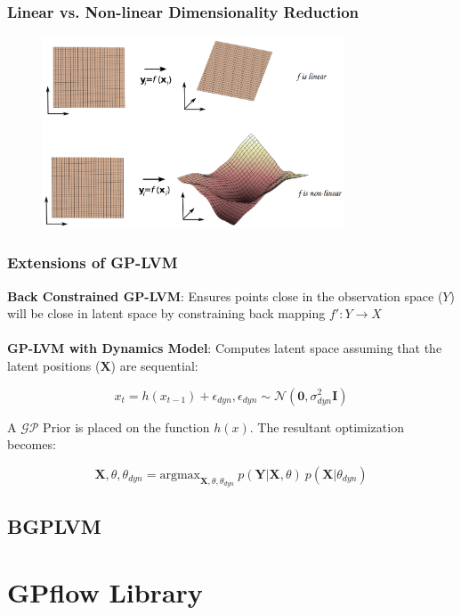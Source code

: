 \documentclass[10pt]{beamer}
\begin{document}
  \begin{frame}
  \frametitle{Linear vs. Non-linear Dimensionality Reduction}

  \begin{figure}
    \centering
    \includegraphics[width=0.8\textwidth]{mapping.png}
  \end{figure}

  \end{frame}

  \begin{frame}
  \frametitle{Extensions of GP-LVM}

  \textbf{Back Constrained GP-LVM}: Ensures points close in the observation space ($Y$) will be close in latent space by constraining back mapping $f': Y \rightarrow X$\\~\\

  \textbf{GP-LVM with Dynamics Model}: Computes latent space assuming that the latent positions ($\mathbf{X}$) are sequential:

  \begin{equation}
    x_t = h(x_{t-1}) + \epsilon_{dyn}, \epsilon_{dyn} \sim \mathcal{N}(\mathbf{0},\sigma^2_{dyn}\mathbf{I})
  \end{equation}

  A $\mathcal{GP}$ Prior is placed on the function $h(x)$. The resultant optimization becomes:

  \begin{equation}
    \mathbf{X},\theta,\theta_{dyn} = \text{argmax}_{\mathbf{X},\theta,\theta_{dyn}}~p(\mathbf{Y}|\mathbf{X},\theta)~p(\mathbf{X}|\theta_{dyn})
  \end{equation}
  \end{frame}

  \subsection{BGPLVM}

  \section{GPflow Library}
\end{document}
